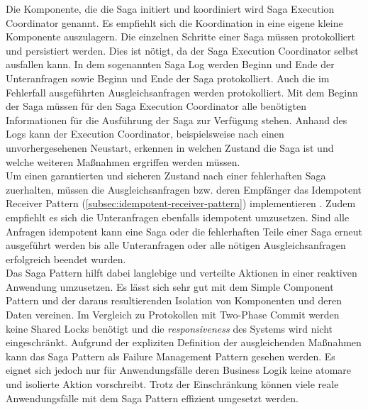 Die Komponente, die die Saga initiert und koordiniert wird Saga Execution Coordinator genannt. Es empfiehlt sich die Koordination in eine eigene kleine Komponente auszulagern. Die einzelnen Schritte einer Saga müssen protokolliert und persistiert werden. Dies ist nötigt, da der Saga Execution Coordinator selbst ausfallen kann. In dem sogenannten Saga Log werden Beginn und Ende der Unteranfragen sowie Beginn und Ende der Saga protokolliert. Auch die im Fehlerfall ausgeführten Ausgleichsanfragen werden protokolliert. Mit dem Beginn der Saga müssen für den Saga Execution Coordinator alle benötigten Informationen für die Ausführung der Saga zur Verfügung stehen. Anhand des Logs kann der Execution Coordinator, beispielsweise nach einen unvorhergesehenen Neustart, erkennen in welchen Zustand die Saga ist und welche weiteren Maßnahmen ergriffen werden müssen.\\
Um einen garantierten und sicheren Zustand nach einer fehlerhaften Saga zuerhalten, müssen die Ausgleichsanfragen bzw. deren Empfänger das Idempotent Receiver Pattern (\ref{subsec:idempotent-receiver-pattern}) implementieren \cite{mccaffrey_goto_2015}. Zudem empfiehlt es sich die Unteranfragen ebenfalls idempotent umzusetzen. Sind alle Anfragen idempotent kann eine Saga oder die fehlerhaften Teile einer Saga erneut ausgeführt werden bis alle Unteranfragen oder alle nötigen Ausgleichsanfragen erfolgreich beendet wurden.\\

Das Saga Pattern hilft dabei langlebige und verteilte Aktionen in einer reaktiven Anwendung umzusetzen. Es lässt sich sehr gut mit dem Simple Component Pattern und der daraus resultierenden Isolation von Komponenten und deren Daten vereinen. Im Vergleich zu Protokollen mit Two-Phase Commit werden keine Shared Locks benötigt und die \textit{responsiveness} des Systems wird nicht eingeschränkt. Aufgrund der expliziten Definition der ausgleichenden Maßnahmen kann das Saga Pattern als Failure Management Pattern gesehen werden. Es eignet sich jedoch nur für Anwendungsfälle deren Business Logik keine atomare und isolierte Aktion vorschreibt. Trotz der Einschränkung können viele reale Anwendungsfälle mit dem Saga Pattern effizient umgesetzt werden.
